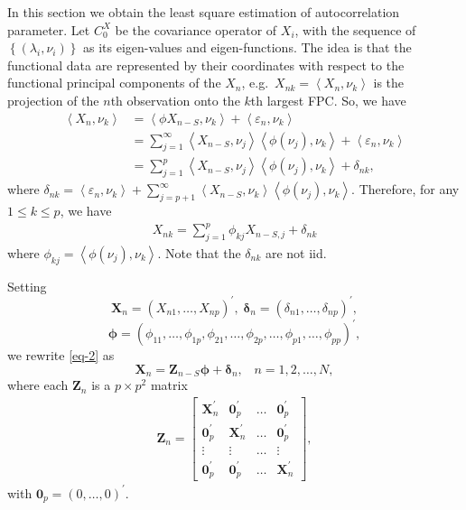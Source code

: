 \documentclass[11pt,a4paper]{article}
\numberwithin{equation}{section}
\begin{document}
In this section we obtain the least square estimation of autocorrelation parameter. Let $C_0^X$ be the covariance operator of $X_i$,  with the sequence of $\left\{\left(\lambda_i,\nu_i\right)\right\}$ as its eigen-values and eigen-functions. The idea is that the functional data are represented by their coordinates with respect to the functional principal components of the $X_{n}$, e.g.\ $X_{nk}=\left\langle{X_{n}},\nu_{k}\right\rangle$ is the projection of the $n$th observation onto the $k$th largest FPC. So, we have
\begin{align}
  \left\langle{X_{n}},\nu_{k}\right\rangle
    & = \left\langle{\phi X_{n-S}},\nu_{k}\right\rangle+\left\langle{\varepsilon_{n}},\nu_{k}\right\rangle\nonumber \\
    & = \sum_{j=1}^{\infty}\left\langle{X_{n-S}},\nu_{j}\right\rangle\left\langle{\phi(\nu_{j})},\nu_{k}\right\rangle+
    \left\langle{\varepsilon_{n}},\nu_{k}\right\rangle\nonumber \\
    & = \sum_{j=1}^{p}\left\langle{X_{n-S}},\nu_{j}\right\rangle\left\langle{\phi(\nu_{j})},\nu_{k}\right\rangle+\delta_{nk},
\end{align}
where $\delta_{nk}=\left\langle{\varepsilon_{n}},\nu_{k}\right\rangle+\sum_{j=p+1}^{\infty}\left\langle{X_{n-S}},\nu_{k}\right\rangle \left\langle{\phi(\nu_{j})},\nu_{k}\right\rangle$. Therefore, for any $1\leq k\leq p$, we have
\begin{align}\label{eq-2}
  X_{nk}=\sum_{j=1}^{p}\phi_{kj}X_{n-S,j}+\delta_{nk}
\end{align}
where $\phi_{kj}=\left\langle{\phi(\nu_{j})},\nu_{k}\right\rangle.$ Note that the $\delta_{nk}$ are not iid.

Setting
\[
  \bm{X}_{n}=(X_{n1},\dots,X_{np})^{\prime},\;\bm{\delta}_{n}=(\delta_{n1},\dots,\delta_{np})^{\prime},
\]
\[
  \bm{\phi}=(\phi_{11},\dots,\phi_{1p},\phi_{21},\dots,\phi_{2p},\dots,\phi_{p1},\dots,\phi_{pp})^{\prime},
\]
we rewrite \eqref{eq-2} as
\[
  \bm{X}_{n}=\bm{Z}_{n-S}\bm{\phi}+\bm{\delta}_{n},\;\;\;n=1,2,\dots,N,
\]
where each $\bm{Z}_{n}$ is a $p\times p^{2}$ matrix
\begin{align}
  \bm{Z}_{n} =
      \begin{bmatrix}
        \bm{X}_{n}^{\prime} & \bm{0}_{p}^{\prime} & \dots & \bm{0}_{p}^{\prime} \\
        \bm{0}_{p}^{\prime} & \bm{X}_{n}^{\prime} & \dots & \bm{0}_{p}^{\prime} \\
        \vdots              & \vdots              & \dots & \vdots \\
        \bm{0}_{p}^{\prime} & \bm{0}_{p}^{\prime} & \dots & \bm{X}_{n}^{\prime}
      \end{bmatrix},
\end{align}
with $\bm{0}_{p}=(0,\dots,0)^{\prime}$.
\end{document}

